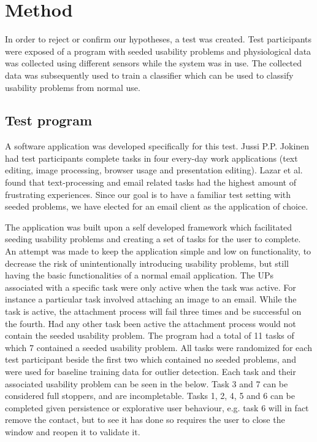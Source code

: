 
\section{Method}
In order to reject or confirm our hypotheses, a test was created.
Test participants were exposed of a program with seeded usability problems and physiological data was collected using different sensors while the system was in use. 
The collected data was subsequently used to train a classifier which can be used to classify usability problems from normal use.

\subsection{Test program}
A software application was developed specifically for this test. 
Jussi P.P. Jokinen\cite{workplace_up_study} had test participants complete tasks in four every-day work applications (text editing, image processing, browser usage and presentation editing). 
Lazar et al.\cite{frustration_with_computers} found that text-processing and email related tasks had the highest amount of frustrating experiences.
Since our goal is to have a familiar test setting with seeded problems, we have elected for an email client as the application of choice.

The application was built upon a self developed framework which facilitated seeding usability problems and creating a set of tasks for the user to complete. 
An attempt was made to keep the application simple and low on functionality, to decrease the risk of unintentionally introducing usability problems, but still having the basic functionalities of a normal email application.  
The UPs associated with a specific task were only active when the task was active. 
For instance a particular task involved attaching an image to an email. 
While the task is active, the attachment process will fail three times and be successful on the fourth. 
Had any other task been active the attachment process would not contain the seeded usability problem.
The program had a total of 11 tasks of which 7 contained a seeded usability problem. 
All tasks were randomized for each test participant beside the first two which contained no seeded problems, and were used for baseline training data for outlier detection. 
Each task and their associated usability problem can be seen in the below. 
Task 3 and 7 can be considered full stoppers, and are incompletable. 
Tasks 1, 2, 4, 5 and 6 can be completed given persistence or explorative user behaviour, e.g. task 6 will in fact remove the contact, but to see it has done so requires the user to close the window and reopen it to validate it.
